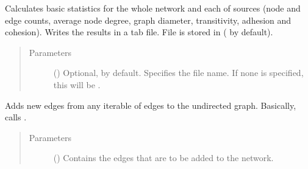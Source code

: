 \documentclass[letterpaper,10pt,english]{sphinxmanual}
\begin{document}
\begin{fulllineitems}
\begin{fulllineitems}
\end{fulllineitems}


\begin{fulllineitems}
\label{\detokenize{reference:pypath.main.PyPath.network_stats}}
Calculates basic statistics for the whole network and each of
sources (node and edge counts, average node degree, graph
diameter, transitivity, adhesion and cohesion). Writes the
results in a tab file. File is stored in
 ( by default).
\begin{quote}\begin{description}
\item[{Parameters}] \leavevmode
{} () \textendash{} Optional,  by default. Specifies the file name. If
none is specified, this will be
.

\end{description}\end{quote}

\end{fulllineitems}


\begin{fulllineitems}
\label{\detokenize{reference:pypath.main.PyPath.new_edges}}
Adds new edges from any iterable of edges to the undirected
graph. Basically, calls .
\begin{quote}\begin{description}
\item[{Parameters}] \leavevmode
{} () \textendash{} Contains the edges that are to be added to the network.

\end{description}\end{quote}


\end{fulllineitems}
\end{fulllineitems}
\end{document}
